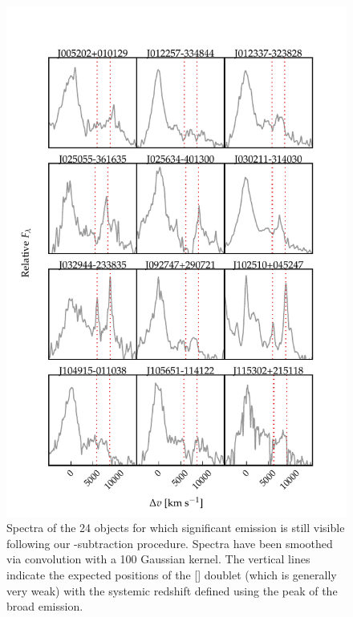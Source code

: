 \begin{figure}
    \centering
    \includegraphics[width=\columnwidth]{figures/chapter04/example_spectrum_grid_extreme_fe_1.pdf} 
    \caption[{Spectra of the 24 objects for which significant  emission is still visible following our -subtraction procedure.}]{Spectra of the 24 objects for which significant  emission is still visible following our -subtraction procedure. Spectra have been smoothed via convolution with a 100 \kms Gaussian kernel. The vertical lines indicate the expected positions of the [] doublet (which is generally very weak) with the systemic redshift defined using the peak of the broad \hb emission.}     
    \label{fig:bad_fe_1}
\end{figure}

